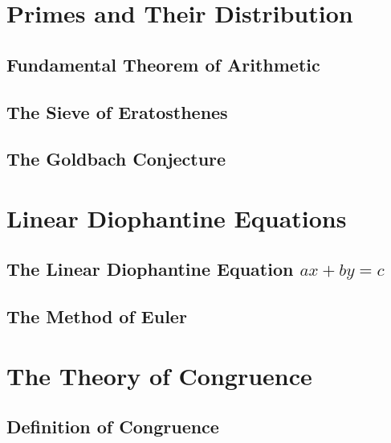 \documentclass{book}
\theoremstyle{definition}
\theoremstyle{remark}
\begin{document}
\section{Primes and Their Distribution}
\subsection{Fundamental Theorem of Arithmetic}
\subsection{The Sieve of Eratosthenes}
\subsection{The Goldbach Conjecture}

\newpage
\section{Linear Diophantine Equations}
\subsection{The Linear Diophantine Equation $ax + by = c$}
\subsection{The Method of Euler}


\newpage
\section{The Theory of Congruence}
\subsection{Definition of Congruence}
\end{document}
